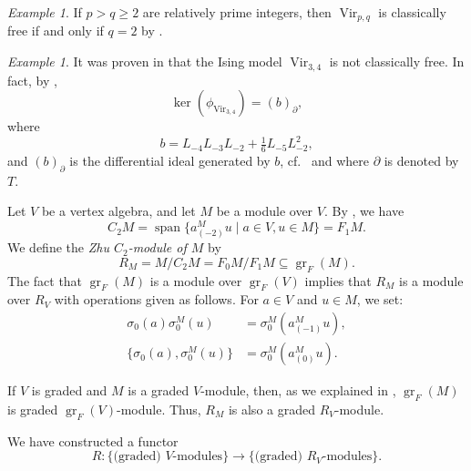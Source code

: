 \documentclass[a4paper, 12pt, reqno]{amsart}
\theoremstyle{remark}
\newtheorem{example}[theorem]{Example}
\DeclareMathOperator{\Vir}{Vir}
\DeclareMathOperator{\gr}{gr}
\DeclareMathOperator{\vspan}{span}
\begin{document}
\begin{example}
  \label{exa:14}
  If $p > q \ge 2$ are relatively prime integers, then $\Vir_{p, q}$ is classically free if and only if $q = 2$ by \cite{van_ekeren_chiral_2021}.
\end{example}

\begin{example}
  \label{exa:15}
  It was proven in \cite{andrews_singular_2022} that the Ising model $\Vir_{3, 4}$ is not classically free.
  In fact, by \cite[Theorem 2]{andrews_singular_2022},
  \begin{equation*}
    \ker(\phi_{\Vir_{3, 4}}) = (b)_{\partial},
  \end{equation*}
  where
  \begin{equation*}
    b = L_{-4}L_{-3}L_{-2} + \tfrac{1}{6}L_{-5}L_{-2}^2,
  \end{equation*}
  and $(b)_{\partial}$ is the differential ideal generated by $b$, cf.\  and  where $\partial$ is denoted by $T$.
\end{example}

Let $V$ be a vertex algebra, and let $M$ be a module over $V$.
By , we have
\begin{equation*}
  C_2M = \vspan\{a^M_{(-2)}u \mid a \in V, u \in M\} = F_1M.
\end{equation*}
We define the \emph{Zhu $C_2$-module of $M$} by
\begin{equation*}
  R_M = M/C_2M = F_0M/F_1M \subseteq \gr_F(M).
\end{equation*}
The fact that $\gr_F(M)$ is a module over $\gr_F(V)$ implies that $R_M$ is a module over $R_V$ with operations given as follows.
For $a \in V$ and $u \in M$, we set:
\begin{align*}
  \sigma_0(a)\sigma^M_0(u) &= \sigma^M_0(a^M_{(-1)}u), \\
  \{\sigma_0(a), \sigma^M_0(u)\} &= \sigma^M_0(a^M_{(0)}u).
\end{align*}

If $V$ is graded and $M$ is a graded $V$-module, then, as we explained in , $\gr_F(M)$ is graded $\gr_F(V)$-module.
Thus, $R_M$ is also a graded $R_V$-module.

We have constructed a functor
\begin{equation*}
  R: \{\text{(graded) $V$-modules}\} \to \{\text{(graded) $R_V$-modules}\}.
\end{equation*}
\end{document}
